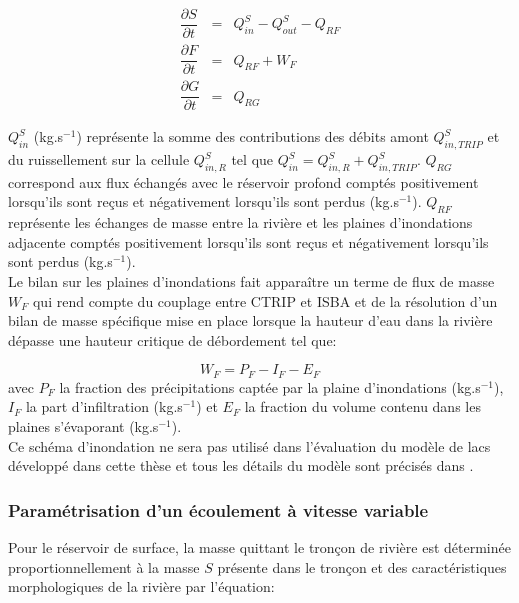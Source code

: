 \begin{eqnarray}
\dfrac{\partial S}{\partial t} &=&  Q_{in}^{S} - Q_{out}^{S} - Q_{RF} \\ 
\dfrac{\partial F}{\partial t} &=& Q_{RF}+ W_{F} \\ 
\dfrac{\partial G}{\partial t} &=& Q_{RG}
\end{eqnarray}

\noindent $Q_{in}^{S}$ (kg.s$^{-1}$) représente la somme des contributions des débits amont $Q_{in, TRIP}^{S}$ et du ruissellement sur la cellule $ Q_{in, R}^{S}$ tel que $Q_{in}^{S} = Q_{in, R}^{S}+ Q_{in, TRIP}^{S}$. $Q_{RG}$ correspond aux flux échangés avec le réservoir profond comptés positivement lorsqu'ils sont reçus et négativement lorsqu'ils sont perdus (kg.s$^{-1}$). $Q_{RF}$ représente les échanges de masse entre la rivière et les plaines d'inondations adjacente comptés positivement lorsqu'ils sont reçus et négativement lorsqu'ils sont perdus (kg.s$^{-1}$). \\
\clearpage
\noindent Le bilan sur les plaines d'inondations fait apparaître un terme de flux de masse $W_{F}$ qui rend compte du couplage entre CTRIP et ISBA et de la résolution d'un bilan de masse spécifique mise en place lorsque la hauteur d'eau dans la rivière dépasse une hauteur critique de débordement tel que:

\begin{equation}
W_{F} = P_{F} - I_{F} - E_{F}
\end{equation}
avec $P_{F}$ la fraction des précipitations captée par la plaine d'inondations (kg.s$^{-1}$), $I_{F}$ la part d'infiltration (kg.s$^{-1}$) et $E_{F}$ la fraction du volume contenu dans les plaines s'évaporant (kg.s$^{-1}$).\\

\noindent Ce schéma d'inondation ne sera pas utilisé dans l'évaluation du modèle de lacs développé dans cette thèse et tous les détails du modèle sont précisés dans \citet{decharme2010}.

\subsubsection{\selectfont Paramétrisation d'un écoulement à vitesse variable}
\label{subsec:vitesse_var}

Pour le réservoir de surface, la masse quittant le tronçon de rivière est déterminée proportionnellement à la masse $S$ présente dans le tronçon et des caractéristiques morphologiques de la rivière par l'équation:

